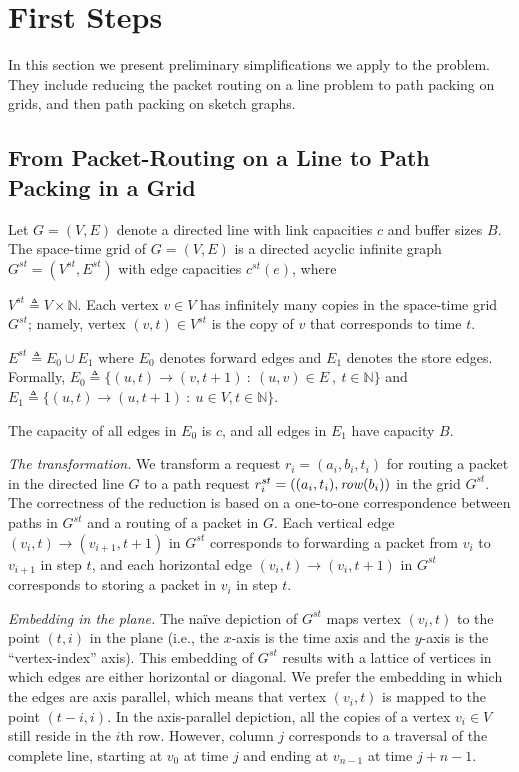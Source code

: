 \documentclass[11pt]{article}
\newenvironment{proof sketch}[1]{\noindent {\emph{Proof sketch of #1:}}}{\hfill \qed}
\newcommand{\row}{\text{\emph{row}}\xspace}
\begin{document}
\section{First Steps}
\label{sec:prelim}
In this section we present preliminary simplifications we apply to the
problem. They include reducing the packet routing on a line problem to path
packing on grids, and then path packing on sketch graphs.

\subsection{From Packet-Routing on a Line to Path Packing in a Grid}
\label{sec:reduction}



Let $G=(V,E)$ denote a directed line with link capacities $c$ and
buffer sizes $B$. The space-time grid of $G=(V,E)$ is a directed
acyclic infinite graph $G^{st} =(V^{st},E^{st})$ with edge capacities
$c^{st}(e)$, where
\begin{inparaenum}[(i)]
\item $V^{st} \triangleq V\times \mathbb{N}$. Each vertex $v \in V$
  has infinitely many copies in the space-time grid $G^{st}$; namely,
  vertex $(v,t)\in V^{st}$ is the copy of $v$ that corresponds to time
  $t$.
\item $E^{st}\triangleq E_0\cup E_1$ where $E_0$ denotes forward edges
  and $E_1$ denotes the store edges.  Formally, $E_0\triangleq \{
  (u,t)\rightarrow(v,t+1)\::\: (u,v)\in E~,~t\in\mathbb{N}\}$ and $E_1
  \triangleq \{ (u,t)\rightarrow (u,t+1) \::\: u\in V, t\in
  \mathbb{N}\}$.
\item The capacity of all edges in $E_0$ is $c$, and all edges in
  $E_1$ have capacity $B$.
\end{inparaenum}

\emph{The transformation.} We transform a request
$r_i=(a_i,b_i,t_i)$ for routing a packet in the directed
line $G$ to a path request $r^{st}_i=((a_i,t_i),\row(b_i))$
in the grid $G^{st}$. The correctness of the reduction is
based on a one-to-one correspondence between paths in
$G^{st}$ and a routing of a packet in $G$. Each vertical
edge $(v_i,t)\rightarrow(v_{i+1},t+1)$ in $G^{st}$
corresponds to forwarding a packet from $v_i$ to $v_{i+1}$
in step $t$, and each horizontal edge
$(v_i,t)\rightarrow(v_{i},t+1)$ in $G^{st}$ corresponds to
storing a packet in $v_i$ in step $t$.

\emph{Embedding in the plane.} The na\"ive depiction of
$G^{st}$ maps vertex $(v_i,t)$ to the point $(t,i)$ in the
plane (i.e., the $x$-axis is the time axis and the $y$-axis
is the ``vertex-index'' axis). This embedding of $G^{st}$
results with a lattice of vertices in which edges are
either horizontal or diagonal.  We prefer the embedding in
which the edges are axis parallel, which means that vertex
$(v_i,t)$ is mapped to the point $(t-i,i)$.  In the
axis-parallel depiction, all the copies of a vertex $v_i\in
V$ still reside in the $i$th row. However, column $j$
corresponds to a traversal  of the complete line, starting
at $v_0$ at time $j$ and ending at $v_{n-1}$ at time
$j+n-1$.
\end{document}
